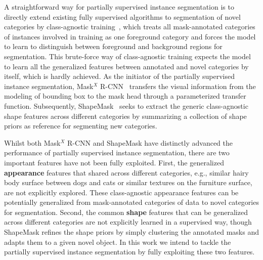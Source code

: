 \documentclass[runningheads]{llncs}
\begin{document}
A straightforward way for partially supervised instance segmentation is to directly extend existing fully supervised algorithms to segmentation of novel categories by class-agnostic training~\cite{pinheiro2015learning,pinheiro2016learning}, which treats all mask-annotated categories of instances involved in training as one foreground category and forces the model to learn to distinguish between foreground and background regions for segmentation. This brute-force way of class-agnostic training expects the model to learn all the generalized features between annotated and novel categories by itself, which is hardly achieved. As the initiator of the partially supervised instance segmentation, Mask$^X$ R-CNN~\cite{hu2018learning} transfers the visual information from the modeling of bounding box to the mask head through a parameterized transfer function. Subsequently, ShapeMask~\cite{kuo2019shapemask} seeks to extract the generic class-agnostic shape features across different categories by summarizing a collection of shape priors as reference for segmenting new categories. 

Whilst both Mask$^X$ R-CNN and ShapeMask have distinctly advanced the performance of partially supervised instance segmentation, there are two important features have not been fully exploited. First, the generalized \textbf{appearance} features that shared across different categories, e.g., similar hairy body surface between dogs and cats or similar textures on the furniture surface, are not explicitly explored. These class-agnostic appearance features can be potentially generalized from mask-annotated categories of data to novel categories for segmentation. Second, the common \textbf{shape} features that can be generalized across different categories are not explicitly learned in a supervised way, though ShapeMask refines the shape priors by simply clustering the annotated masks and adapts them to a given novel object. In this work we intend to tackle the partially supervised instance segmentation by fully exploiting these two features. 
\end{document}
